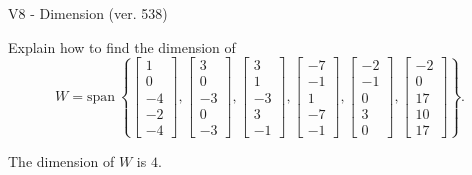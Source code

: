 \begin{exercise}
  \begin{exerciseTitle}V8 - Dimension (ver. 538)\end{exerciseTitle}
  \begin{exerciseStatement}
    Explain how to find the dimension of 
\[W=\mathrm{span}\ \left\{\left[\begin{array}{r}
1 \\
0 \\
-4 \\
-2 \\
-4
\end{array}\right] , \left[\begin{array}{r}
3 \\
0 \\
-3 \\
0 \\
-3
\end{array}\right] , \left[\begin{array}{r}
3 \\
1 \\
-3 \\
3 \\
-1
\end{array}\right] , \left[\begin{array}{r}
-7 \\
-1 \\
1 \\
-7 \\
-1
\end{array}\right] , \left[\begin{array}{r}
-2 \\
-1 \\
0 \\
3 \\
0
\end{array}\right] , \left[\begin{array}{r}
-2 \\
0 \\
17 \\
10 \\
17
\end{array}\right]\right\}.\]



  \end{exerciseStatement}
  \begin{exerciseAnswer}
   The dimension of \(W\) is  \(4\).
  


  \end{exerciseAnswer}
\end{exercise}